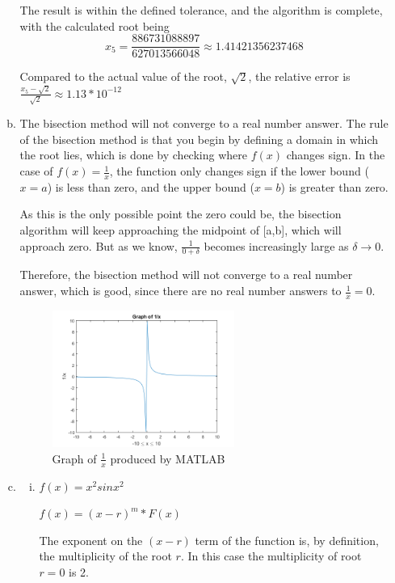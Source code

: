 \documentclass[11pt]{article}
\begin{document}
\begin{enumerate}
\begin{enumerate}[(a)]
		The result is within the defined tolerance, and the algorithm is complete, with the calculated root being
		$$x_5 = \frac{886731088897}{627013566048} \approx 1.41421356237468$$

		Compared to the actual value of the root, $\sqrt{2}$, the relative error is
		$\frac{x_5 - \sqrt{2}}{\sqrt{2}} \approx 1.13*10^{-12}$ \\

		\item The bisection method will not converge to a real number answer. The rule of the bisection method is that you begin by
		defining a domain in which the root lies, which is done by checking where $f(x)$ changes sign. In the case of
		$f(x) = \frac{1}{x} $, the function only changes sign if the lower bound ($x=a$) is less than zero, and the upper bound
		($x=b$) is greater than zero.

		As this is the only possible point the zero could be, the bisection algorithm will keep approaching the midpoint of
		[a,b], which will approach zero. But as we know,
		$\frac{1}{0+\delta}$ becomes increasingly large as $\delta \to 0$.

		Therefore, the bisection method will not converge to a real number answer, which is good, since there are no real number
		answers to $\frac{1}{x} = 0$. \\

		\begin{figure}[H]
			\centering
			\includegraphics[width=0.6\textwidth]{q1i.png}
			\caption{Graph of $\frac{1}{x}$ produced by MATLAB}
		\end{figure}

		\item
		\begin{enumerate}[i.]
		\item $f(x) = x^2sinx^2$

		$f(x) = (x-r)^m*F(x)$

		The exponent on the $(x-r)$ term of the function is, by definition, the multiplicity of the root $r$. In this case
		the multiplicity of root $r = 0$ is 2.


\end{enumerate}
\end{enumerate}
\end{enumerate}
\end{document}
